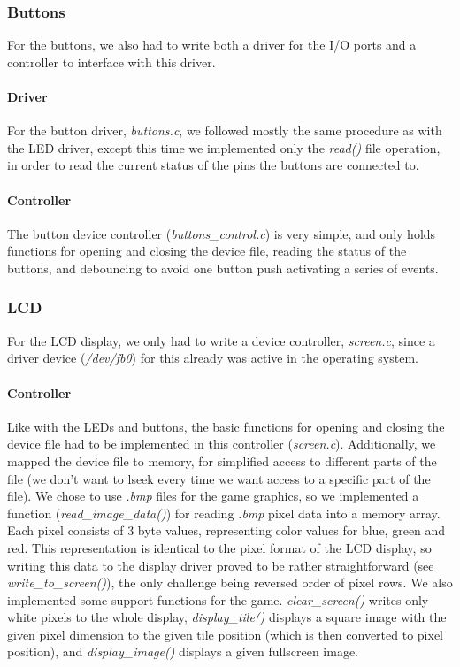 \documentclass[a4paper,11pt]{article}
\begin{document}
\subsubsection{Buttons}
For the buttons, we also had to write both a driver for the I/O ports and a controller to interface with this driver.
\paragraph{Driver} For the button driver, \textit{buttons.c}, we followed mostly the same procedure as with the LED driver, except this time we implemented only the \textit{read()} file operation, in order to read the current status of the pins the buttons are connected to.
\paragraph{Controller} The button device controller (\textit{buttons\_control.c}) is very simple, and only holds functions for opening and closing the device file, reading the status of the buttons, and debouncing to avoid one button push activating a series of events.


\subsubsection{LCD} 
\label{sec:lcd}
For the LCD display, we only had to write a device controller, \textit{screen.c}, since a driver device (\textit{/dev/fb0}) for this already was active in the operating system. 
\paragraph{Controller} Like with the LEDs and buttons, the basic functions for opening and closing the device file had to be implemented in this controller (\textit{screen.c}). Additionally, we mapped the device file to memory, for simplified access to different parts of the file (we don't want to lseek every time we want access to a specific part of the file). We chose to use \textit{.bmp} files for the game graphics, so we implemented a function (\textit{read\_image\_data()}) for reading \textit{.bmp} pixel data into a memory array. Each pixel consists of 3 byte values, representing color values for blue, green and red. This representation is identical to the pixel format of the LCD display, so writing this data to the display driver proved to be rather straightforward (see \textit{write\_to\_screen()}), the only challenge being reversed order of pixel rows. We also implemented some support functions for the game. \textit{clear\_screen()} writes only white pixels to the whole display, \textit{display\_tile()} displays a square image with the given pixel dimension to the given tile position (which is then converted to pixel position), and \textit{display\_image()} displays a given fullscreen image.
\end{document}
